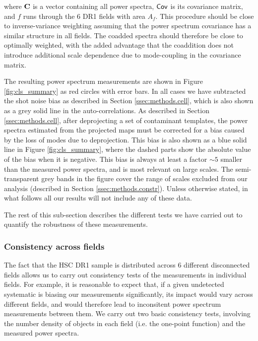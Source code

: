 \documentclass[a4paper,11pt]{article}
\begin{document}
      where ${\bf C}$ is a vector containing all power spectra, ${\sf Cov}$ is its covariance matrix, and $f$ runs through the 6 DR1 fields with area $A_f$. This procedure should be close to inverse-variance weighting assuming that the power spectrum covariance has a similar structure in all fields. The coadded spectra should therefore be close to optimally weighted, with the added advantage that the coaddition does not introduce additional scale dependence due to mode-coupling in the covariance matrix.
      
      The resulting power spectrum measurements are shown in Figure \ref{fig:cls_summary} as red circles with error bars. In all cases we have subtracted the shot noise bias as described in Section \ref{ssec:methods.cell}, which is also shown as a grey solid line in the auto-correlations. As described in Section \ref{ssec:methods.cell}, after deprojecting a set of contaminant templates, the power spectra estimated from the projected maps must be corrected for a bias caused by the loss of modes due to deprojection. This bias is also shown as a blue solid line in Figure \ref{fig:cls_summary}, where the dashed parts show the absolute value of the bias when it is negative. This bias is always at least a factor $\sim5$ smaller than the measured power spectra, and is most relevant on large scales. The semi-transparent grey bands in the figure cover the range of scales excluded from our analysis (described in Section \ref{ssec:methods.constr}). Unless otherwise stated, in what follows all our results will not include any of these data.
      
      The rest of this sub-section describes the different tests we have carried out to quantify the robustness of these measurements.

    \subsubsection{Consistency across fields}\label{sssec:results.spectra.consistent}
      The fact that the HSC DR1 sample is distributed across 6 different disconnected fields allows us to carry out consistency tests of the measurements in individual fields. For example, it is reasonable to expect that, if a given undetected systematic is biasing our measurements significantly, its impact would vary across different fields, and would therefore lead to inconsitent power spectrum measurements between them. We carry out two basic consistency tests, involving the number density of objects in each field (i.e. the one-point function) and the measured power spectra.
      
\end{document}
